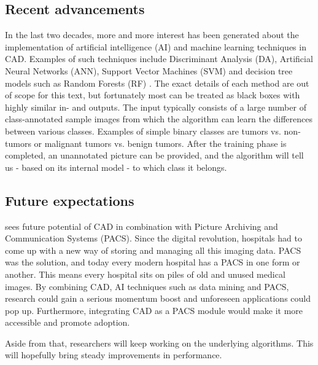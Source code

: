 \subsection{Recent advancements}\label{ssec:cadadv}
In the last two decades, more and more interest has been generated about the
implementation of artificial intelligence (AI) and machine learning techniques
in CAD. Examples of such techniques include Discriminant Analysis (DA),
Artificial Neural Networks (ANN), Support Vector Machines (SVM) and decision
tree models such as Random Forests (RF) \cite{lungcadreview, ginneken}. The
exact details of each method are out of scope for this text, but fortunately
most can be treated as black boxes with highly similar in- and outputs. The
input typically consists of a large number of class-annotated sample images from
which the algorithm can learn the differences between various classes. Examples
of simple binary classes are tumors vs. non-tumors or malignant tumors vs.
benign tumors. After the training phase is completed, an unannotated picture can
be provided, and the algorithm will tell us - based on its internal model - to
which class it belongs.

\subsection{Future expectations}
\cite{cadhistory} sees future potential of CAD in combination with Picture
Archiving and Communication Systems (PACS). Since the digital revolution,
hospitals had to come up with a new way of storing and managing all this imaging
data. PACS was the solution, and today every modern hospital has a PACS in one
form or another. This means every hospital sits on piles of old and unused
medical images. By combining CAD, AI techniques such as data mining and PACS,
research could gain a serious momentum boost and unforeseen applications could
pop up. Furthermore, integrating CAD as a PACS module would make it more
accessible and promote adoption.

Aside from that, researchers will keep working on the underlying algorithms.
This will hopefully bring steady improvements in performance.
